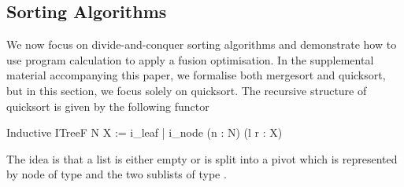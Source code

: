 \documentclass[a4paper,UKenglish,cleveref, autoref, thm-restate]{lipics-v2021}
\newcommand{\mvol}[1]{\textcolor{blue}{\textsc{Michael}: #1}}
\begin{document}
%
%

\subsection{Sorting Algorithms}\label{sec:sorting}
We now focus on divide-and-conquer sorting algorithms and demonstrate how to use
program calculation to apply a fusion optimisation. In the supplemental material
accompanying this paper, we formalise both mergesort and quicksort, but in this
section, we focus solely on quicksort. The recursive structure of quicksort is
given by the following functor
\begin{coqcode}
Inductive ITreeF N X := i_leaf | i_node (n : N) (l r : X)
\end{coqcode}
The idea is that a list is either empty or is split into a pivot which is
represented by node of type  and the two sublists of type .
\end{document}
